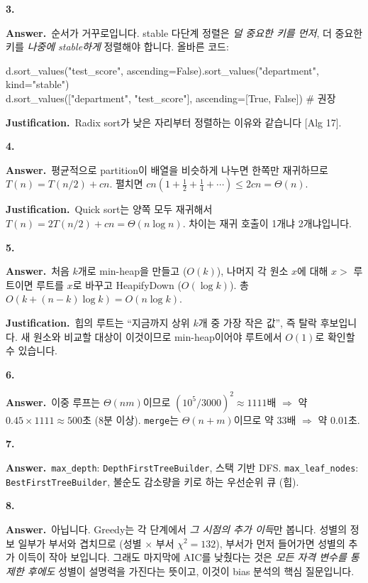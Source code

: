 \documentclass[11pt,a4paper]{article}
\newcommand{\code}[1]{\texttt{#1}}
\newcommand{\aref}[1]{{\footnotesize\textsf{\color{blue!55!black}[Alg #1]}}}
\newcommand{\Ans}{\par\textbf{Answer.}\ }
\newcommand{\Just}{\par\textbf{Justification.}\ }
\begin{document}
\textbf{3.}
\Ans 순서가 거꾸로입니다. stable 다단계 정렬은 \emph{덜 중요한 키를 먼저}, 더 중요한 키를 \emph{나중에 stable하게} 정렬해야 합니다. 올바른 코드:
\begin{codebox}
d.sort\_values("test\_score", ascending=False).sort\_values("department", kind="stable")\\
d.sort\_values(["department", "test\_score"], ascending=[True, False]) \hfill \# 권장
\end{codebox}

\Just Radix sort가 낮은 자리부터 정렬하는 이유와 같습니다 \aref{17}.

\textbf{4.}
\Ans 평균적으로 partition이 배열을 비슷하게 나누면 한쪽만 재귀하므로 $T(n)=T(n/2)+cn$. 펼치면 $cn(1+\frac12+\frac14+\cdots)\le2cn=\Theta(n)$.
\Just Quick sort는 양쪽 모두 재귀해서 $T(n)=2T(n/2)+cn=\Theta(n\log n)$. 차이는 재귀 호출이 1개냐 2개냐입니다.

\textbf{5.}
\Ans 처음 $k$개로 min-heap을 만들고 ($O(k)$), 나머지 각 원소 $x$에 대해 $x>$ 루트이면 루트를 $x$로 바꾸고 HeapifyDown ($O(\log k)$). 총 $O(k+(n-k)\log k)=O(n\log k)$.
\Just 힙의 루트는 ``지금까지 상위 $k$개 중 가장 작은 값'', 즉 탈락 후보입니다. 새 원소와 비교할 대상이 이것이므로 min-heap이어야 루트에서 $O(1)$로 확인할 수 있습니다.

\textbf{6.}
\Ans 이중 루프는 $\Theta(nm)$이므로 $(10^5/3000)^2\approx1111$배 $\Rightarrow$ 약 $0.45\times1111\approx500$초 (8분 이상). \code{merge}는 $\Theta(n+m)$이므로 약 33배 $\Rightarrow$ 약 0.01초.

\textbf{7.}
\Ans \code{max\_depth}: \code{DepthFirstTreeBuilder}, 스택 기반 DFS. \code{max\_leaf\_nodes}: \code{BestFirstTreeBuilder}, 불순도 감소량을 키로 하는 우선순위 큐 (힙).

\textbf{8.}
\Ans 아닙니다. Greedy는 각 단계에서 \emph{그 시점의 추가 이득}만 봅니다. 성별의 정보 일부가 부서와 겹치므로 (성별 $\times$ 부서 $\chi^2=132$), 부서가 먼저 들어가면 성별의 추가 이득이 작아 보입니다. 그래도 마지막에 AIC를 낮췄다는 것은 \emph{모든 자격 변수를 통제한 후에도} 성별이 설명력을 가진다는 뜻이고, 이것이 bias 분석의 핵심 질문입니다.
\end{document}
